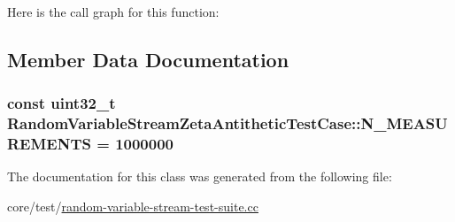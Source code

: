 Here is the call graph for this function\+:




\subsection{Member Data Documentation}
\subsubsection[{\texorpdfstring{N\+\_\+\+M\+E\+A\+S\+U\+R\+E\+M\+E\+N\+TS}{N_MEASUREMENTS}}]{\setlength{\rightskip}{0pt plus 5cm}const uint32\+\_\+t Random\+Variable\+Stream\+Zeta\+Antithetic\+Test\+Case\+::\+N\+\_\+\+M\+E\+A\+S\+U\+R\+E\+M\+E\+N\+TS = 1000000\hspace{0.3cm}{\ttfamily [static]}}\hypertarget{classRandomVariableStreamZetaAntitheticTestCase_a0a981bdb2baa96c4abbf5dfb6b1533b9}{}\label{classRandomVariableStreamZetaAntitheticTestCase_a0a981bdb2baa96c4abbf5dfb6b1533b9}


The documentation for this class was generated from the following file\+:\begin{DoxyCompactItemize}
\item 
core/test/\hyperlink{random-variable-stream-test-suite_8cc}{random-\/variable-\/stream-\/test-\/suite.\+cc}\end{DoxyCompactItemize}
